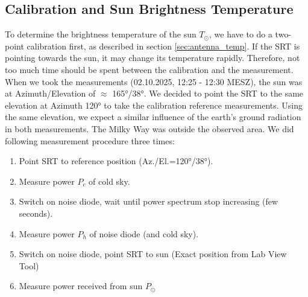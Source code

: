 \subsection{Calibration and Sun Brightness Temperature}
To determine the brightness temperature of the sun $T_\odot$, we have to do a two-point calibration first, as described in section \ref{sec:antenna_temp}.
If the SRT is pointing towards the sun, it may change its temperature rapidly. Therefore, not too much time should be spent between the calibration and the measurement.
When we took the measurements (02.10.2025, 12:25 - 12:30 MESZ), the sun was at Azimuth/Elevation of $\approx$ 165°/38°.
We decided to point the SRT to the same elevation at Azimuth 120° to take the calibration reference measurements. Using the same elevation, we expect a similar influence of the earth's ground radiation in both measurements. 
The Milky Way was outside the observed area. We did following measurement procedure three times:

\begin{enumerate}
	\item Point SRT to reference position (Az./El.=120°/38°).
	\item Measure power $P_c$ of cold sky.
	\item Switch on noise diode, wait until power spectrum stop increasing (few seconds).
	\item Measure power $P_h$ of noise diode (and cold sky).
	\item Switch on noise diode, point SRT to sun (Exact position from Lab View Tool)
	\item Measure power received from sun $P_\odot$
\end{enumerate}

